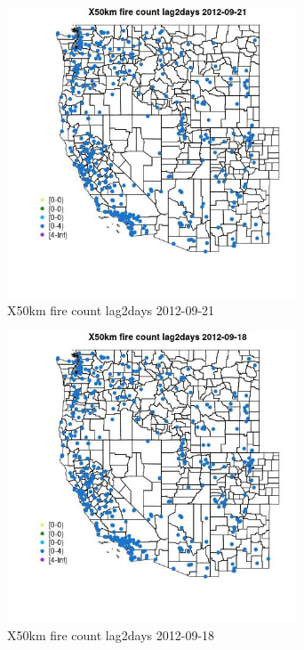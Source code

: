 \begin{figure} 
\centering  
\includegraphics[width=0.77\textwidth]{Code_Outputs/Report_ML_input_PM25_Step4_part_e_de_duplicated_aves_compiled_2019-05-14wNAs_MapObsX50km_fire_count_lag2days2012-09-21.jpg} 
\caption{\label{fig:Report_ML_input_PM25_Step4_part_e_de_duplicated_aves_compiled_2019-05-14wNAsMapObsX50km_fire_count_lag2days2012-09-21}X50km fire count lag2days 2012-09-21} 
\end{figure} 
 

\begin{figure} 
\centering  
\includegraphics[width=0.77\textwidth]{Code_Outputs/Report_ML_input_PM25_Step4_part_e_de_duplicated_aves_compiled_2019-05-14wNAs_MapObsX50km_fire_count_lag2days2012-09-18.jpg} 
\caption{\label{fig:Report_ML_input_PM25_Step4_part_e_de_duplicated_aves_compiled_2019-05-14wNAsMapObsX50km_fire_count_lag2days2012-09-18}X50km fire count lag2days 2012-09-18} 
\end{figure} 
 

